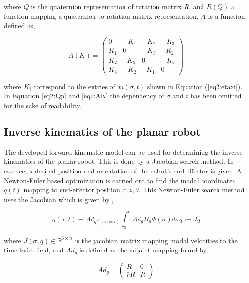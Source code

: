 where $Q$ is the quaternion representation of rotation matrix $R$, and $R(Q)$ a function mapping a quaternion to rotation matrix representation, $A$ is a function defined as,


\begin{equation}
    A(K) = \begin{pmatrix} 0 & -K_1 & -K_2 & -K_3 \\ K_1 & 0 & -K_3 & \hspace{8pt}K_2 \\ K_2 & \hspace{8pt}K_3 & 0 & -K_1 \\ K_3 & -K_2 & \hspace{8pt}K_1 & 0 \end{pmatrix}
    \label{eq2:AK}
\end{equation}

where $K_i$ correspond to the entries of $xi(\sigma,t)$ shown in Equation (\ref{eq2:etaxi}). In Equation \ref{eq2:Qp} and \ref{eq2:AK} the dependency of $\sigma$ and $t$ has been omitted for the sake of readability.

\subsection{Inverse kinematics of the planar robot}

The developed forward kinematic model can be used for determining the inverse kinematics of the planar robot. This is done by a Jacobian search method. In essence, a desired position and orientation of the robot's end-effector is given. A Newton-Euler based optimization is carried out to find the modal coordinates $q(t)$ mapping to end-effector position $x,z,\theta$. This Newton-Euler search method uses the Jacobian which is given by \cite{Caasenbrood2020},

\begin{equation}
\eta(\sigma,t) = Ad_{g^{-1}(\sigma = l)} \int_{0}^{\sigma} Ad_g B_a \Phi(\sigma) d\sigma \dot{q} := J\dot{q}
\end{equation}

where $J(\sigma,q) \in \mathbb{R}^{6 \times n}$ is the jacobian matrix mapping modal velocities to the time-twist field, and $Ad_g$ is defined as the adjoint mapping found by,


\begin{equation}
    Ad_g = \begin{pmatrix} R & 0 \\ \hat{r}R & R \end{pmatrix}
\end{equation}

